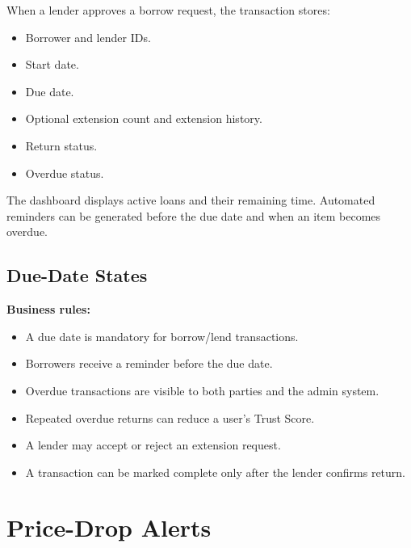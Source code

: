 \documentclass[11pt,a4paper]{article}
\begin{document}
When a lender approves a borrow request, the transaction stores:
\begin{itemize}
    \item Borrower and lender IDs.
    \item Start date.
    \item Due date.
    \item Optional extension count and extension history.
    \item Return status.
    \item Overdue status.
\end{itemize}

The dashboard displays active loans and their remaining time. Automated reminders can be generated before the due date and when an item becomes overdue.

\subsection{Due-Date States}

\begin{center}
\end{center}

\textbf{Business rules:}
\begin{itemize}
    \item A due date is mandatory for borrow/lend transactions.
    \item Borrowers receive a reminder before the due date.
    \item Overdue transactions are visible to both parties and the admin system.
    \item Repeated overdue returns can reduce a user's Trust Score.
    \item A lender may accept or reject an extension request.
    \item A transaction can be marked complete only after the lender confirms return.
\end{itemize}

\section{Price-Drop Alerts}
\end{document}
